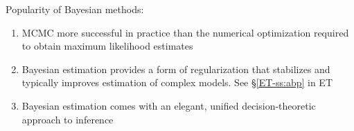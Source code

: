 \begin{frame}

    \vspace{2em}
    Popularity of Bayesian methods:
    \begin{enumerate}
        \item  MCMC more successful in practice than 
        the numerical optimization required to obtain maximum likelihood
        estimates
        \item   Bayesian estimation provides a form of
        regularization that stabilizes and typically improves estimation of complex
        models.  See \S\ref{ET-ss:abp} in ET
        \item  Bayesian estimation comes with
        an elegant, unified decision-theoretic approach to inference
    \end{enumerate}
    
\end{frame}


